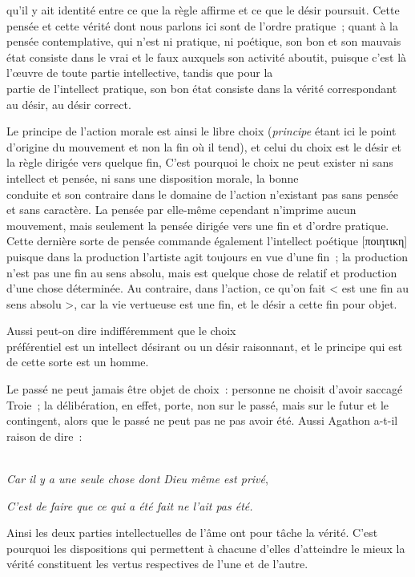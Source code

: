 \documentclass[french,twoside]{book} %
\begin{document}
qu’il y ait identité entre ce que la règle affirme et ce que le désir poursuit. Cette pensée et cette vérité dont nous parlons ici sont de l’ordre pratique ; quant à la pensée contemplative, qui n’est ni pratique, ni poétique, son bon et son mauvais état consiste dans le vrai et le faux auxquels son activité aboutit, puisque c’est là l’œuvre de toute partie intellective, tandis que pour la \\
partie de l’intellect pratique, son bon état consiste dans la vérité correspondant au désir, au désir correct.\par
Le principe de l’action morale est ainsi le libre choix ({\itshape principe} étant ici le point d’origine du mouvement et non la fin où il tend), et celui du choix est le désir et la règle dirigée vers quelque fin, C’est pourquoi le choix ne peut exister ni sans intellect et pensée, ni sans une disposition morale, la bonne \\
conduite et son contraire dans le domaine de l’action n’existant pas sans pensée et sans caractère. La pensée par elle-même cependant n’imprime aucun mouvement, mais seulement la pensée dirigée vers une fin et d’ordre pratique. Cette dernière  sorte de pensée commande également l’intellect poétique [ποιητικη] puisque dans la production l’artiste agit toujours en vue d’une fin ; la production n’est pas une fin au sens absolu, mais est quelque chose de relatif et production d’une chose déterminée. Au contraire, dans l’action, ce qu’on fait < est une fin au sens absolu >, car la vie vertueuse est une fin, et le désir a cette fin pour objet.\par
Aussi peut-on dire indifféremment que le choix \\
préférentiel est un intellect désirant ou un désir raisonnant, et le principe qui est de cette sorte est un homme.\par
Le passé ne peut jamais être objet de choix : personne ne choisit d’avoir saccagé Troie ; la délibération, en effet, porte, non sur le passé, mais sur le futur et le contingent, alors que le passé ne peut pas ne pas avoir été. Aussi Agathon a-t-il raison de dire :\par
\\
{\itshape Car il y a une seule chose dont Dieu même est privé}, \par
 {\itshape C’est de faire que ce qui a été fait ne l’ait pas été.} \par
Ainsi les deux parties intellectuelles de l’âme ont pour tâche la vérité. C’est pourquoi les dispositions qui permettent à chacune d’elles d’atteindre le mieux la vérité constituent les vertus respectives de l’une et de l’autre.
\end{document}
